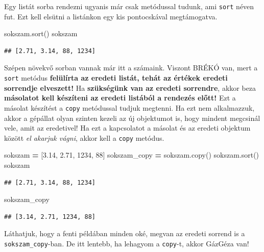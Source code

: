 \documentclass[
]{book}
\newenvironment{Shaded}{\begin{snugshade}}{\end{snugshade}}
\newcommand{\DecValTok}[1]{\textcolor[rgb]{0.00,0.00,0.81}{#1}}
\newcommand{\FloatTok}[1]{\textcolor[rgb]{0.00,0.00,0.81}{#1}}
\newcommand{\NormalTok}[1]{#1}
\newcommand{\OperatorTok}[1]{\textcolor[rgb]{0.81,0.36,0.00}{\textbf{#1}}}
\begin{document}
Egy listát sorba rendezni ugyanis már csak metódussal tudunk, ami \texttt{sort} néven fut. Ezt kell elsütni a listánkon egy kis pontocskával megtámogatva.

\begin{Shaded}
\begin{Highlighting}[]
\NormalTok{sokszam.sort()}
\NormalTok{sokszam}
\end{Highlighting}
\end{Shaded}

\begin{verbatim}
## [2.71, 3.14, 88, 1234]
\end{verbatim}

Szépen növekvő sorban vannak már itt a számaink. Viszont BRÉKÓ van, mert a \texttt{sort} metódus \textbf{felülírta az eredeti listát, tehát az értékek eredeti sorrendje elveszett!} Ha \textbf{szükségünk van az eredeti sorrendre}, akkor beza \textbf{másolatot kell készíteni az eredeti listából a rendezés előtt!} Ezt a másolat készítést a \texttt{copy} metódussal tudjuk megtenni. Ha ezt nem alkalmazzuk, akkor a gépállat olyan szinten kezeli az új objektumot is, hogy mindent megcsinál vele, amit az eredetivel! Ha ezt a kapcsolatot a másolat és az eredeti objektum között \emph{el akarjuk vágni}, akkor kell a \texttt{copy} metódus.

\begin{Shaded}
\begin{Highlighting}[]
\NormalTok{sokszam }\OperatorTok{=}\NormalTok{ [}\FloatTok{3.14}\NormalTok{, }\FloatTok{2.71}\NormalTok{, }\DecValTok{1234}\NormalTok{, }\DecValTok{88}\NormalTok{]}
\NormalTok{sokszam\_copy }\OperatorTok{=}\NormalTok{ sokszam.copy()}
\NormalTok{sokszam.sort()}
\NormalTok{sokszam}
\end{Highlighting}
\end{Shaded}

\begin{verbatim}
## [2.71, 3.14, 88, 1234]
\end{verbatim}

\begin{Shaded}
\begin{Highlighting}[]
\NormalTok{sokszam\_copy}
\end{Highlighting}
\end{Shaded}

\begin{verbatim}
## [3.14, 2.71, 1234, 88]
\end{verbatim}

Láthatjuk, hogy a fenti példában minden oké, megvan az eredeti sorrend is a \texttt{sokszam\_copy}-ban. De itt lentebb, ha lehagyom a \texttt{copy}-t, akkor GázGéza van!
\end{document}
